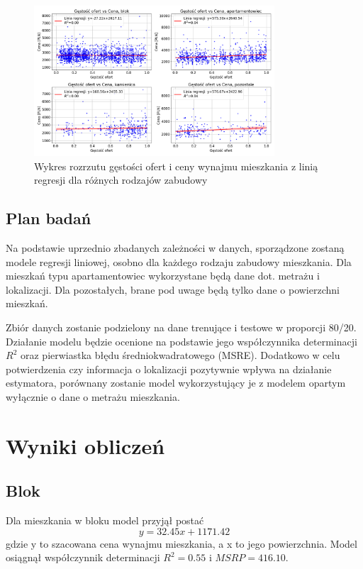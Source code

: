 \documentclass[10pt]{article}
\begin{document}
\begin{figure}[H]
    \centering
    \includegraphics[width=0.8\textwidth]{density-price-builttype.png}
    \caption{Wykres rozrzutu gęstości ofert i ceny wynajmu mieszkania z linią regresji dla różnych rodzajów zabudowy}
    \label{fig:density_price_builttype}
\end{figure}


\subsection{Plan badań}
Na podstawie uprzednio zbadanych zależności w danych, sporządzone zostaną modele regresji liniowej, osobno dla każdego rodzaju zabudowy mieszkania.
Dla mieszkań typu apartamentowiec wykorzystane będą dane dot. metrażu i lokalizacji. Dla pozostałych, brane pod uwage będą tylko dane o powierzchni mieszkań.

Zbiór danych zostanie podzielony na dane trenujące i testowe w proporcji 80/20. Działanie modelu będzie ocenione na podstawie jego współczynnika determinacji $ R^2 $ oraz pierwiastka błędu średniokwadratowego (MSRE).
Dodatkowo w celu potwierdzenia czy informacja o lokalizacji pozytywnie wpływa na działanie estymatora, porównany zostanie model wykorzystujący je z modelem opartym wyłącznie o dane o metrażu mieszkania.

\section{Wyniki obliczeń}

\subsection{Blok}
Dla mieszkania w bloku model przyjął postać 
\begin {equation}
y = 32.45x + 1171.42
\end{equation}
gdzie y to szacowana cena wynajmu mieszkania, a x to jego powierzchnia.
Model osiągnął współczynnik determinacji $ R^2 = 0.55 $ i $ MSRP = 416.10 $.
\end{document}

